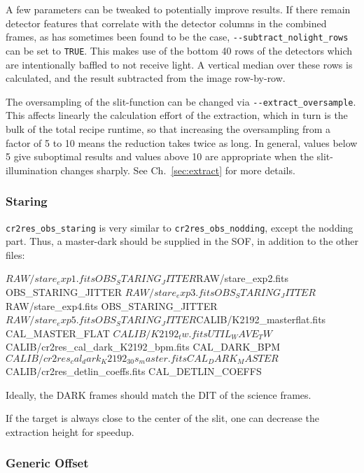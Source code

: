 A few parameters can be tweaked to potentially improve results. If there remain
detector features that correlate with the detector columns in the combined
frames, as has sometimes been found to be the case,
\verb!--subtract_nolight_rows! can be set to \verb!TRUE!. This makes use of the
bottom 40 rows of the detectors which are intentionally baffled to not receive
light. A vertical median over these rows is calculated, and the result subtracted
from the image row-by-row.

The oversampling of the slit-function can be changed via
\verb!--extract_oversample!. This affects linearly the calculation effort of the
extraction, which in turn is the bulk of the total recipe runtime, so that
increasing the oversampling from a factor of 5 to 10 means the reduction takes
twice as long. In general, values below 5 give suboptimal results and values
above 10 are appropriate when the slit-illumination changes sharply. See
Ch.~\ref{sec:extract} for more details.


\subsubsection{Staring}

\verb!cr2res_obs_staring! is very similar to \verb!cr2res_obs_nodding!, except
the nodding part. Thus, a master-dark should be supplied in the SOF, in addition
to the other files:
\begin{shell}[fontsize=\small]
$RAW/stare_exp1.fits        OBS_STARING_JITTER
$RAW/stare_exp2.fits        OBS_STARING_JITTER
$RAW/stare_exp3.fits        OBS_STARING_JITTER
$RAW/stare_exp4.fits        OBS_STARING_JITTER
$RAW/stare_exp5.fits        OBS_STARING_JITTER
$CALIB/K2192_masterflat.fits                  CAL_MASTER_FLAT
$CALIB/K2192_tw.fits                          UTIL_WAVE_TW
$CALIB/cr2res_cal_dark_K2192_bpm.fits         CAL_DARK_BPM
$CALIB/cr2res_cal_dark_K2192_30s_master.fits  CAL_DARK_MASTER
$CALIB/cr2res_detlin_coeffs.fits              CAL_DETLIN_COEFFS
\end{shell}  
Ideally, the DARK frames should match the DIT of the science frames.

If the target is always close to the center of the slit, one can decrease the extraction height for speedup.
\begin{shell}[fontsize=\small]
\end{shell}  


\subsubsection{Generic Offset}

